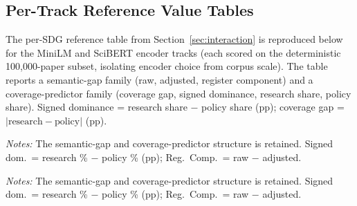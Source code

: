 \documentclass[12pt,a4paper]{article}
\begin{document}






\subsection{Per-Track Reference Value Tables}
\label{app:reference-tables}

The per-SDG reference table from Section~\ref{sec:interaction} is reproduced below for the MiniLM and SciBERT encoder tracks (each scored on the deterministic 100,000-paper subset, isolating encoder choice from corpus scale). The table reports a semantic-gap family (raw, adjusted, register component) and a coverage-predictor family (coverage gap, signed dominance, research share, policy share). Signed dominance = research share $-$ policy share (pp); coverage gap = $|\text{research}-\text{policy}|$ (pp).

\begin{table}[htbp]
\centering
\small
\caption{MiniLM track --- per-SDG reference values (semantic-gap and coverage-predictor families).}
\label{tab:reference-minilm}

\par\smallskip\footnotesize\emph{Notes:} The semantic-gap and coverage-predictor structure is retained. Signed dom.\ = research \% $-$ policy \% (pp); Reg.\ Comp.\ = raw $-$ adjusted.\par
\end{table}

\begin{table}[htbp]
\centering
\small
\caption{SciBERT track --- per-SDG reference values (semantic-gap and coverage-predictor families).}
\label{tab:reference-scibert}

\par\smallskip\footnotesize\emph{Notes:} The semantic-gap and coverage-predictor structure is retained. Signed dom.\ = research \% $-$ policy \% (pp); Reg.\ Comp.\ = raw $-$ adjusted.\par
\end{table}
\end{document}

